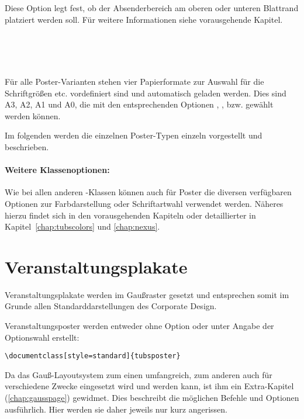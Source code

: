 \begin{Declaration}
\end{Declaration}

Diese Option legt fest, ob der Absenderbereich am oberen oder unteren Blattrand
platziert werden soll. Für weitere Informationen siehe vorausgehende Kapitel.


\begin{Declaration}
  \\
  \\
  \\
\end{Declaration}

Für alle Poster-Varianten stehen vier Papierformate zur Auswahl für die
Schriftgrößen etc. vordefiniert sind und automatisch geladen werden.
Dies sind A3, A2, A1 und A0, die mit den entsprechenden Optionen
, ,  bzw. 
gewählt werden können.
\bigskip

Im folgenden werden die einzelnen Poster-Typen einzeln vorgestellt und beschrieben.

\paragraph{Weitere Klassenoptionen:}

Wie bei allen anderen \tubslatex-Klassen können auch für Poster
die diversen verfügbaren Optionen zur Farbdarstellung oder Schriftartwahl
verwendet werden.
Näheres hierzu findet sich in den vorausgehenden Kapiteln oder detaillierter
in Kapitel~\ref{chap:tubscolors} und \ref{chap:nexus}.

\clearpage
\section{Veranstaltungsplakate}

Veranstaltungsplakate werden im Gaußraster gesetzt und entsprechen somit
im Grunde allen Standarddarstellungen des Corporate Design.

Veranstaltungsposter werden entweder ohne Option oder
unter Angabe der Optionswahl  erstellt:
\begin{lstlisting}
\documentclass[style=standard]{tubsposter}
\end{lstlisting}

Da das Gauß-Layoutsystem zum einen umfangreich, zum anderen auch für verschiedene Zwecke eingesetzt wird und werden kann, ist ihm ein Extra-Kapitel (\ref{chap:gausspage})
gewidmet.
Dies beschreibt die möglichen Befehle und Optionen ausführlich.
Hier werden sie daher jeweils nur kurz angerissen.

